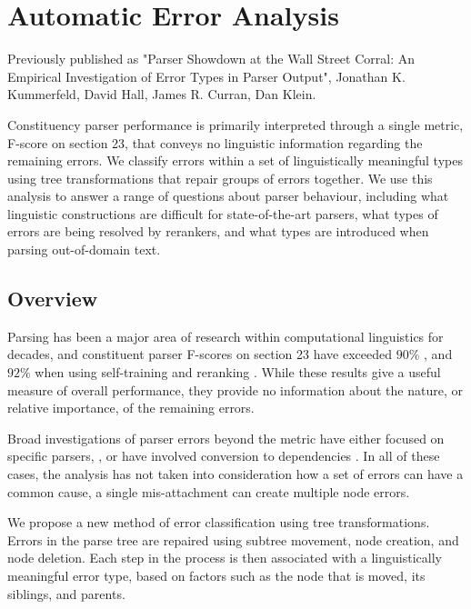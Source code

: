 \chapter{Automatic Error Analysis}


Previously published as "Parser Showdown at the Wall Street Corral: An Empirical Investigation of Error Types in Parser Output", Jonathan K. Kummerfeld, David Hall, James R. Curran, Dan Klein.

Constituency parser performance is primarily interpreted through a single
metric, F-score on \wsj section 23, that conveys no linguistic information
regarding the remaining errors.  We classify errors within a set of
linguistically meaningful types using tree transformations that repair groups
of errors together.  We use this analysis to answer a range of questions about
parser behaviour, including what linguistic constructions are difficult for
state-of-the-art parsers, what types of errors are being resolved by rerankers,
and what types are introduced when parsing out-of-domain text.

\section{Overview}

Parsing has been a major area of research within computational linguistics for
decades, and constituent parser F-scores on \wsj section 23 have exceeded
$90\%$ \cite{Petrov-Klein:2007}, and $92\%$ when using self-training and
reranking \cite{McClosky-Charniak-Johnson:2006,Charniak-Johnson:2005}.  While
these results give a useful measure of overall performance, they provide no
information about the nature, or relative importance, of the remaining errors.

Broad investigations of parser errors beyond the \parseval metric
\cite{Black-etal:1991} have either focused on specific parsers, \eg
\cite{Collins:2003}, or have involved conversion to dependencies
\cite{Carroll-etal:1998,King:2003}.  In all of these cases, the analysis has
not taken into consideration how a set of errors can have a common cause, \eg a
single mis-attachment can create multiple node errors.

We propose a new method of error classification using tree transformations.
Errors in the parse tree are repaired using subtree movement, node
creation, and node deletion.  Each step in the process is then associated with
a linguistically meaningful error type, based on factors such as the node that is
moved, its siblings, and parents.  

